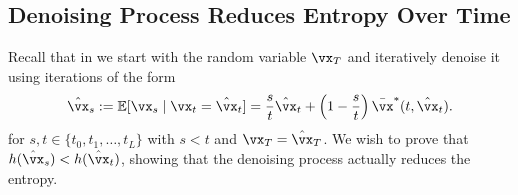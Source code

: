 \documentclass[../../book-main.tex]{subfiles}
\begin{document}
\subsection{Denoising Process Reduces Entropy Over Time}\label{sub:denoising_entropy_decreases}

Recall that in  we start with the random variable \(\vx_{T}\) and iteratively denoise it using iterations of the form
\begin{equation}\label{eq:app_denoising_iteration}
    \hat{\vx}_{s} := \Ex[\vx_{s} \mid \vx_{t} = \hat{\vx}_{t}] = \frac{s}{t}\hat{\vx}_{t} + \bp{1 - \frac{s}{t}}\bar{\vx}^{\ast}(t, \hat{\vx}_{t}).
\end{equation}
for \(s, t \in \{t_{0}, t_{1}, \dots, t_{L}\}\) with \(s < t\) and \(\vx_{T} = \hat{\vx}_{T}\). We wish to prove that \(h(\hat{\vx}_{s}) < h(\hat{\vx}_{t})\), showing that the denoising process actually reduces the entropy.
\end{document}
